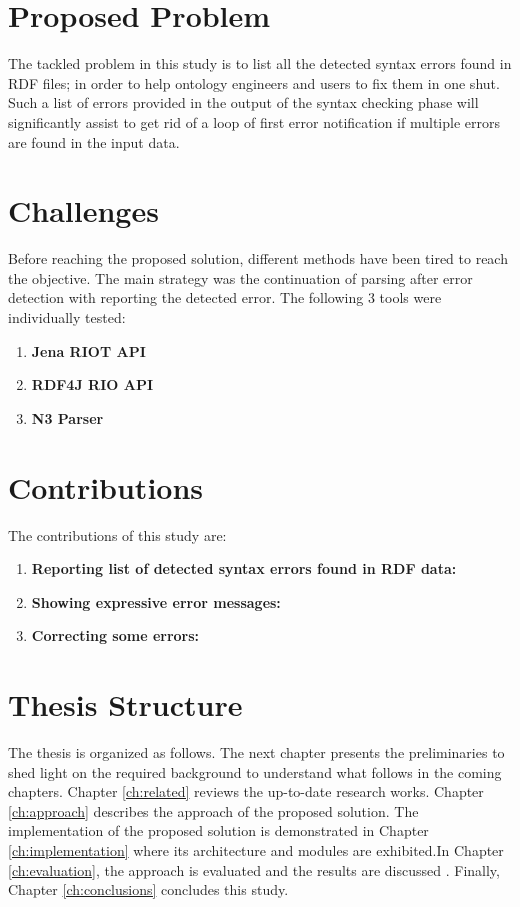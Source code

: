 \section{Proposed Problem } 	
The tackled problem in this study is to list all the detected syntax errors found in RDF files; in order to help ontology engineers and users to fix them in one shut. Such a list of errors provided in the output of the syntax checking phase will significantly assist to get rid of a loop of first error notification if multiple errors are found in the input data.  

\section{Challenges }
Before reaching the proposed solution, different methods have been tired to reach the objective. The main strategy was the continuation of parsing after error detection with reporting the detected error. The following 3 tools were individually tested:
\begin{enumerate}
	\item  {\bf Jena RIOT API} %
	\item {\bf RDF4J RIO API} %
	\item {\bf N3 Parser} %
\end{enumerate}

\section {Contributions}

			The contributions of this study are:
\begin{enumerate}

	\item  {\bf Reporting list of detected syntax errors found in RDF data:} 
	\item {\bf  Showing expressive error messages: }
	\item {\bf Correcting some errors: }
\end{enumerate}




\section {Thesis Structure}
The thesis is organized as follows. The next chapter presents the preliminaries to shed light on the required background to understand what follows in the coming chapters. Chapter \ref{ch:related} reviews the up-to-date research works. Chapter \ref{ch:approach} describes the approach of the proposed solution. The implementation of the proposed solution is demonstrated in Chapter \ref{ch:implementation} where its architecture and modules are exhibited.In Chapter \ref{ch:evaluation}, the approach is evaluated  and the results are discussed . Finally, Chapter
\ref{ch:conclusions} concludes this study.





